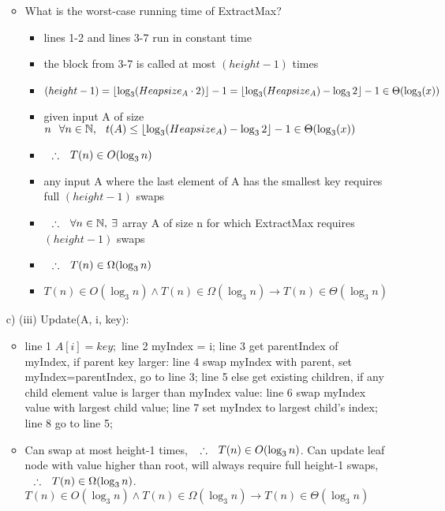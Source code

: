 \documentclass[12pt, oneside]{article}
\DeclarePairedDelimiter\floor{\lfloor}{\rfloor}
\newcommand\tab[1][0.25cm]{\hspace*{#1}}
\newcommand\imp{\rightarrow}
\newcommand\thfr{\tab \therefore \tab}
\begin{document}
\begin{itemize}
\begin{itemize}
	\item What is the worst-case running time of ExtractMax?
		\begin{itemize}
		\item lines 1-2 and lines 3-7 run in constant time
		\item the block from 3-7 is called at most $(height-1)$ times
		\item $(height-1) = \floor{\log_{3}(Heapsize_A\cdot2)} - 1 = \floor{\log_{3}(Heapsize_A)-\log_{3}2} - 1 \in \Theta(\log_3(x))$ 
		\item given input A of size $n \tab \forall n \in \mathbb{N}, \tab t(A) \leq \floor{\log_{3}(Heapsize_A)-\log_{3}2} - 1 \in \Theta(\log_3(x))$
		\item $ \thfr T(n) \in O(\log_{3}n)$
		\item any input A where the last element of A has the smallest key requires full $(height-1)$ swaps
		\item $\thfr \forall n \in \mathbb{N}, \: \exists$ array A of size n for which ExtractMax requires $(height-1)$ swaps
		\item $ \thfr T(n) \in \Omega(\log_{3}n)$
		\item $T(n) \in O(\log_{3}n) \land T(n) \in \Omega(\log_{3}n) \imp T(n) \in \Theta(\log_{3}n)$
		\end{itemize}
	
	\end{itemize}

\item [c) (iii)]  
	\tab[0.75cm]Update(A, i, key): 
	\begin{itemize}
	\item line 1 \tab	$A[i] = key;$\newline
	line 2 \tab myIndex = i; \newline
	line 3 \tab	get parentIndex of myIndex, if parent key larger: \newline	
	line 4 \tab[0.75cm]  swap myIndex with parent, set myIndex=parentIndex, go to line 3; \newline
	line 5 \tab	else get existing children, if any child element value is larger than myIndex value: \newline
	line 6 \tab[0.75cm]	swap myIndex value with largest child value; \newline
	line 7 \tab[0.75cm]	set myIndex to largest child's index; \newline
	line 8 \tab[0.75cm]	go to line 5; \newline
	
	\item Can swap at most height-1 times, $\thfr T(n) \in O(\log_{3}n)$. \newline
	Can update leaf node with value higher than root, will always require full height-1 swaps, $\thfr T(n) \in \Omega(\log_{3}n)$. \newline
	$T(n) \in O(\log_{3}n) \land T(n) \in \Omega(\log_{3}n) \imp T(n) \in \Theta(\log_{3}n)$
	

\end{itemize}
\end{itemize}
\end{document}
